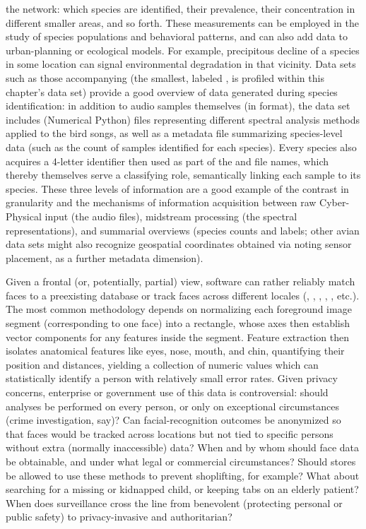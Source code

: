 {\begin{description}
the network: which species are identified, their prevalence, 
their concentration in different smaller areas, and so forth.  
These measurements can be employed in the study of 
species populations and behavioral patterns, and can 
also add data to urban-planning or ecological models.  
For example, precipitous decline of a species in some 
location can signal environmental degradation in that vicinity.   
\pseudoIndent{}
Data sets such as those accompanying \cite{JustinSalamon} 
(the smallest, labeled \CLOds{}, is profiled within
this chapter's data set)   
provide a good overview of data generated during 
species identification: in addition to audio 
samples themselves (in \WAV{} format), the data set 
includes \NPY{} (Numerical Python) files representing 
different spectral analysis methods applied 
to the bird songs, as well as a metadata file 
summarizing species-level data (such as the count 
of samples identified for each species).  
Every species also acquires a 4-letter identifier then used
as part of the \WAV{} and \NPY{} file names, which thereby 
themselves serve a classifying role, 
semantically linking each sample to its species.  
These three levels of information are a good 
example of the contrast in granularity 
\mdash{} and the mechanisms of information acquisition 
\mdash{} between raw Cyber-Physical input (the audio files), midstream 
processing (the spectral representations), and 
summarial overviews (species counts and labels;   
other avian data sets might also recognize 
geospatial coordinates obtained via noting sensor placement, 
as a further metadata dimension).
 
\item[Facial Recognition]  Given a frontal (or, potentially, 
partial) view, software can 
rather reliably match faces to a preexisting database or 
track faces across different locales (\cite{WeiLunChao},
\cite{YueqiDuan}, \cite{GaryHuang}, 
\cite{KalaiselviNithya}, \cite{FengLu}, etc.).  
The most common methodology depends 
on normalizing each foreground image segment (corresponding to 
one face) into a rectangle, whose axes then establish vector 
components for any features inside the segment.  Feature extraction 
then isolates anatomical features like eyes, nose, mouth, and 
chin, quantifying their position and distances, yielding a 
collection of numeric values which can statistically 
identify a person with relatively small error rates.  
\pseudoIndent{}
Given privacy concerns, enterprise or government use 
of this data is controversial: should analyses be performed 
on every person, or only on exceptional circumstances 
(crime investigation, say)?  Can facial-recognition outcomes 
be anonymized so that faces would be tracked across locations 
but not tied to specific persons without extra (normally 
inaccessible) data?  When and by whom should face data be 
obtainable, and under what legal or commercial circumstances?  
Should stores be allowed to use these methods to 
prevent shoplifting, for example?  What about searching 
for a missing or kidnapped child, or keeping tabs on an 
elderly patient?  When does surveillance cross the line 
from benevolent (protecting personal or public safety) 
to privacy-invasive and authoritarian?
\end{description}
}
